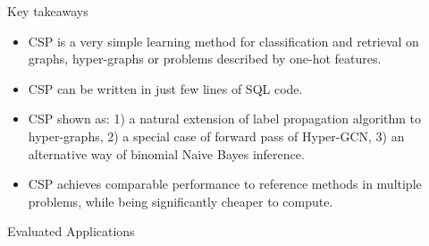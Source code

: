 \documentclass{beamer}
\newlength{\colwidth}
\begin{document}
\begin{frame}[fragile,t]
\begin{columns}[t]
\begin{column}{\colwidth}
    \begin{alertblock}{Key takeaways}
        \begin{itemize}
            \item CSP is a very simple learning method for classification and retrieval on graphs, hyper-graphs or problems described by one-hot features. 
            \item CSP can be written in just few lines of SQL code.
            \item CSP shown as: 1) a natural extension of label propagation algorithm to hyper-graphs, 2) a special case of forward pass of Hyper-GCN, 3) an alternative way of binomial Naive Bayes inference.
            \item CSP achieves comparable performance to reference methods in multiple problems, while being significantly cheaper to compute.
        \end{itemize}
    \end{alertblock}
    
    \begin{block}{Evaluated Applications}
    \end{block}


\end{column}
\end{columns}
\end{frame}
\end{document}
